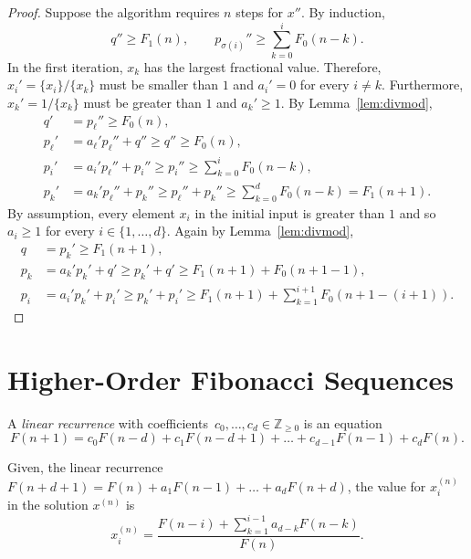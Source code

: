 \begin{proof}
  Suppose the algorithm requires $n$ steps for $x''$.
  By induction,
  \[
    q'' ≥ F_1(n),
    \qquad
    p_{σ(i)}'' ≥ ∑_{k=0}^i F_0(n - k).
  \]
  In the first iteration,
  $x_k$ has the largest fractional value.
  Therefore, $x_i' = \{x_i\}/\{x_k\}$ must be smaller than $1$ and $a_i' = 0$ for every $i ≠ k$.
  Furthermore, $x_k' = 1/\{x_k\}$ must be greater than $1$ and $a_k' ≥ 1$.
  By Lemma~\ref{lem:divmod},
  \begin{align*}
    q' & = p_ℓ'' ≥ F_0(n), \\
    p_ℓ' & = a_ℓ' p_ℓ'' + q'' ≥ q'' ≥ F_0(n), \\
    p_i' & = a_i' p_ℓ'' + p_i'' ≥ p_i'' ≥ \sum_{k=0}^i F_0(n - k), \\
    p_k' & = a_k' p_ℓ'' + p_k'' ≥ p_ℓ'' + p_k'' ≥ \sum_{k=0}^d F_0(n - k) = F_1(n+1).
  \end{align*}
  By assumption, every element $x_i$ in the initial input is greater than $1$ and
  so $a_i ≥ 1$ for every $i ∈ \{1, …, d\}$.
  Again by Lemma~\ref{lem:divmod},
  \begin{align*}
    q & = p_k' ≥ F_1(n + 1), \\
    p_k & = a_k' p_k' + q' ≥ p_k' + q' ≥ F_1(n+1) + F_0(n + 1 - 1), \\
    p_i & = a_i' p_k' + p_i' ≥ p_k' + p_i' ≥ F_1(n+1) + \sum_{k=1}^{i+1} F_0(n+1 - (i+1)).
  \end{align*}
\end{proof}


\section{Higher-Order Fibonacci Sequences}

\begin{definition}
  A \emph{linear recurrence} with coefficients~$c_0, \dots, c_d ∈ ℤ_{≥ 0}$ is an equation
  \[
    F(n + 1) = c_0 F(n - d) + c_1 F(n - d + 1) + \dots + c_{d-1} F(n - 1) + c_d F(n).
  \]
\end{definition}

Given, the linear recurrence $F(n + d + 1) = F(n) + a_1 F(n - 1) + \dots + a_d F(n + d)$,
the value for $x_i^{(n)}$ in the solution $x^{(n)}$ is
\begin{equation}
  \label{eq:general-solution}
  x_i^{(n)} = \frac{F(n - i) + \sum_{k=1}^{i-1} a_{d-k} F(n - k)}{F(n)}.
\end{equation}

